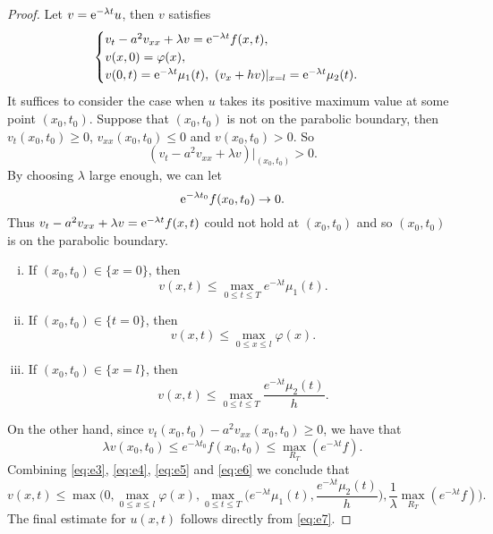 \begin{proof}
  Let $v = \mathrm{e}^{-\lambda t}u$, then $v$ satisfies
  \[\begin{cases}
    v_t-a^2v_{xx}+\lambda v = \mathrm{e}^{-\lambda t}f(x,t), \\
    v(x,0) = \varphi(x), \\
    v(0,t) = \mathrm{e}^{-\lambda t}\mu_1(t),\ (v_x+hv)|_{x=l} = \mathrm{e}^{-\lambda t}\mu_2(t).
  \end{cases}\]
  It suffices to consider the case when $u$ takes its positive maximum value at some point $(x_0,t_0)$.
  Suppose that $(x_0,t_0)$ is not on the parabolic boundary, then
  $v_t(x_0,t_0)\geq 0$, $v_{xx}(x_0,t_0)\leq 0$ and $v(x_0,t_0)>0$. So
  \begin{equation}\label{eq:e1}
    (v_t - a^2v_{xx} + \lambda v)\big|_{(x_0,t_0)} > 0.
  \end{equation}
  By choosing $\lambda$ large enough, we can let
  \begin{equation}\label{eq:e2}
    \mathrm{e}^{-\lambda t_0} f(x_0,t_0) \to 0.
  \end{equation}
  Thus $v_t-a^2v_{xx}+\lambda v = \mathrm{e}^{-\lambda t}f(x,t)$ could not hold at $(x_0,t_0)$
  and so $(x_0,t_0)$ is on the parabolic boundary.
  \begin{enumerate}[(i)]
    \item If $(x_0,t_0)\in \{x=0\}$, then
      \begin{equation}\label{eq:e3}
        v(x,t) \leq \max_{0\leq t\leq T} e^{-\lambda t} \mu_1(t).
      \end{equation}
    \item If $(x_0,t_0)\in \{t=0\}$, then
      \begin{equation}\label{eq:e4}
        v(x,t) \leq \max_{0\leq x\leq l} \varphi(x).
      \end{equation}
    \item If $(x_0,t_0)\in \{x=l\}$, then
      \begin{equation}\label{eq:e5}
        v(x,t) \leq \max_{0\leq t\leq T} \frac{e^{-\lambda t}\mu_2(t)}{h}.
      \end{equation}
  \end{enumerate}
  On the other hand, since $v_t(x_0,t_0)-a^2v_{xx}(x_0,t_0) \geq 0$, we have that
  \begin{equation}\label{eq:e6}
    \lambda v(x_0,t_0) \leq e^{-\lambda t_0} f(x_0,t_0) \leq \max_{R_T} (e^{-\lambda t}f).
  \end{equation}
  Combining \eqref{eq:e3}, \eqref{eq:e4}, \eqref{eq:e5} and \eqref{eq:e6} we conclude that
  \begin{equation}\label{eq:e7}
    v(x,t) \leq \max\biggl(0, \max_{0\leq x\leq l} \varphi(x),
      \max_{0\leq t\leq T} \biggl(e^{-\lambda t}\mu_1(t), \frac{e^{-\lambda t}\mu_2(t)}{h}\biggr),
      \frac{1}{\lambda} \max_{R_T} (e^{-\lambda t}f)\biggr).
  \end{equation}
  The final estimate for $u(x,t)$ follows directly from \eqref{eq:e7}.
\end{proof}

